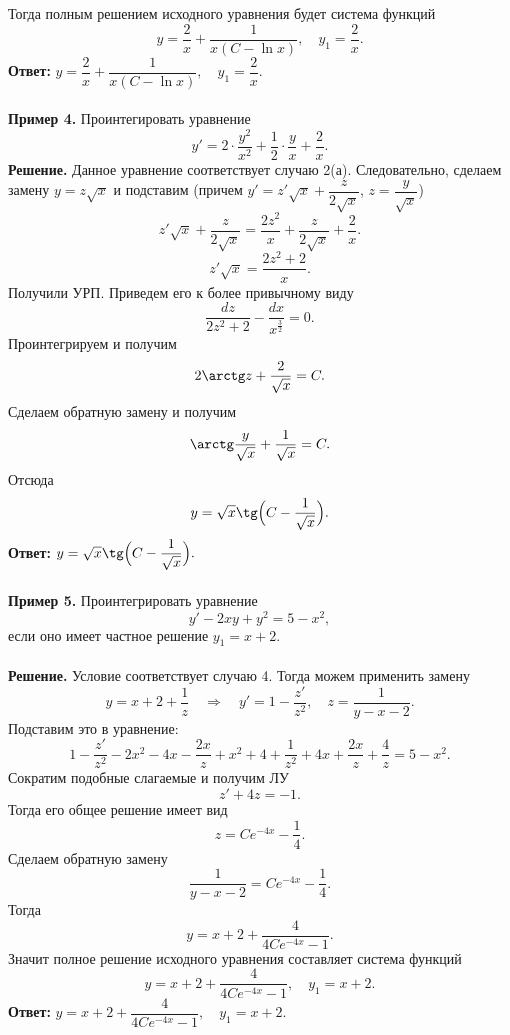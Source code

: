 \documentclass[a4paper, 12pt]{article}
\begin{document}
	Тогда полным решением исходного уравнения будет система функций $$y = \dfrac{2}{x} + \dfrac{1}{x(C-\ln x)},\quad y_1 = \dfrac{2}{x}.$$
	\textbf{Ответ:} $y = \dfrac{2}{x} + \dfrac{1}{x(C-\ln x)},\quad y_1 = \dfrac{2}{x}.$\\\\
	\textbf{Пример 4.} Проинтегировать уравнение $$y' = 2\cdot\dfrac{y^2}{x^2} + \dfrac{1}{2}\cdot \dfrac{y}{x} + \dfrac{2}{x}.$$
	\textbf{Решение.} Данное уравнение соответствует случаю 2(а). Следовательно, сделаем замену $y = z\sqrt{x}$ и подставим (причем $y' = z'\sqrt x + \dfrac{z}{2\sqrt x}$, $z = \dfrac{y}{\sqrt x}$) $$z'\sqrt{x} +  \dfrac{z}{2\sqrt x} = \dfrac{2z^2}{x} +  \dfrac{z}{2\sqrt x} + \dfrac{2}{x}.$$
	$$z'\sqrt x = \dfrac{2z^2 + 2}{x}.$$
	Получили УРП. Приведем его к более привычному виду $$\dfrac{dz}{2z ^ 2 + 2} - \dfrac{dx}{x^\frac32} = 0.$$
	Проинтегрируем и получим $$2\arctg z + \dfrac{2}{\sqrt x} = C.$$
	Сделаем обратную замену и получим $$\arctg \dfrac{y}{\sqrt x} + \dfrac{1}{\sqrt x} = C.$$
	Отсюда $$y = \sqrt x \tg\Big(C - \dfrac{1}{\sqrt x}\Big).$$
	\textbf{Ответ:} $y = \sqrt x \tg\Big(C - \dfrac{1}{\sqrt x}\Big).$\\\\
	\textbf{Пример 5.} Проинтегрировать уравнение $$y' - 2xy + y^2 = 5-x^2,$$ если оно имеет частное решение $y_ 1 = x + 2$.\\\\
	\textbf{Решение.} Условие соответствует случаю 4. Тогда можем применить замену $$y = x + 2 + \dfrac{1}{z}\quad\Rightarrow\quad y' = 1 -\dfrac{z'}{z^2},\quad z = \dfrac{1}{y - x - 2}.$$
	Подставим это в уравнение: $$1 - \dfrac{z'}{z^2} - 2x^2 - 4x - \dfrac{2x}{z} + x^2 + 4 + \dfrac{1}{z^2} + 4x + \dfrac{2x}{z} + \dfrac{4}{z} = 5 - x^2.$$
	Сократим подобные слагаемые и получим ЛУ
	$$z' + 4z = -1.$$
	Тогда его общее решение имеет вид $$z = Ce^{-4x}  - \dfrac{1}{4}.$$
	Сделаем обратную замену $$\dfrac{1}{y - x - 2} = Ce^{-4x}  - \dfrac{1}{4}.$$
	Тогда $$y = x + 2 + \dfrac{4}{4Ce^{-4x} - 1}.$$
	Значит полное решение исходного уравнения составляет система функций $$y = x + 2 + \dfrac{4}{4Ce^{-4x} - 1},\quad y_1 = x+2.$$
	\textbf{Ответ:} $y = x + 2 + \dfrac{4}{4Ce^{-4x} - 1},\quad y_1 = x+2.$
\end{document}
